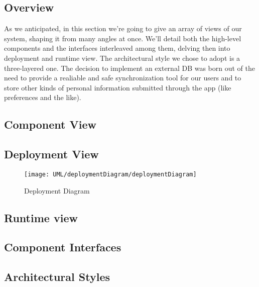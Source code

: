 \subsection{Overview}

	As we anticipated, in this section we’re going to give an array of views of our system, shaping it from many angles at once. We’ll detail both the high-level components and the interfaces interleaved among them, delving then into deployment and runtime view.
	The architectural style we chose to adopt is a three-layered one.
	The decision to implement an external DB was born out of the need to provide a realiable and safe synchronization tool for our users and to store other kinds of personal information submitted through the app (like preferences and the like).

	
\subsection{Component View}
	
	
\subsection{Deployment View}
	\begin{figure}[H]
		\centering
		\texttt{[image: UML/deploymentDiagram/deploymentDiagram]}
		\label{deploymentDiagram}
		\caption{Deployment Diagram}
	\end{figure}
	
\subsection{Runtime view}
	

\subsection{Component Interfaces}
	

\subsection{Architectural Styles}
	